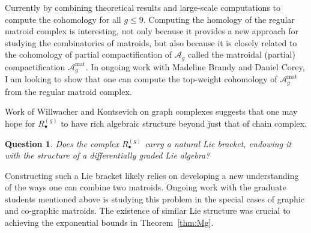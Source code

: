 \documentclass[11pt,reqno]{amsart}
\newtheorem{goalTheorem}[lemma]{Goal Theorem}
\newtheorem{question}[lemma]{Question}
\theoremstyle{remark}
\newcommand{\mat}{\operatorname{mat}}
\newcommand{\cA}{\mathcal{A}}
\begin{document}
Currently by combining theoretical results and large-scale computations to compute the cohomology for all $g\leq 9$. Computing the homology of the regular matroid complex is interesting, not only because it provides a new approach for studying the combinatorics of matroids, but also because it is closely related to the cohomology of partial compactification of $\cA_{g}$ called the matroidal (partial) compactification $\cA_{g}^{\mat}$. In ongoing work with Madeline Brandy and Daniel Corey, I am looking to show that one can compute the top-weight cohomology of $\cA_{g}^{\mat}$ from the regular matroid complex. 


Work of Willwacher \cite{willwacher15} and Kontsevich \cite{kontsevich93, kontsevich94} on graph complexes suggests that one may hope for $R_{\bullet}^{(g)}$ to have rich algebraic structure beyond just that of chain complex.

\begin{question}
Does the complex $R_{\bullet}^{(g)}$ carry a natural Lie bracket, endowing it with the structure of a differentially graded Lie algebra?
\end{question}

Constructing such a Lie bracket likely relies on developing a new understanding of the ways one can combine two matroids. Ongoing work with the graduate students mentioned above is studying this problem in the special cases of graphic and co-graphic matroids. The existence of similar Lie structure was crucial to achieving the exponential bounds in Theorem~\ref{thm:Mg}.
\end{document}
